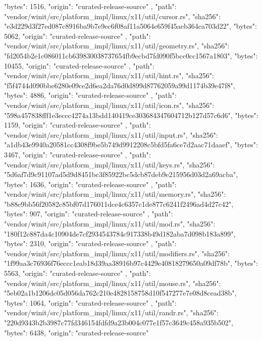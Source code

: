 {{      "bytes": 1516,
      "origin": "curated-release-source"
    },
    {
      "path": "vendor/winit/src/platform_impl/linux/x11/util/cursor.rs",
      "sha256": "e3d229d3f27ed087c8916ba9b7e9ec6f08af11a5064e659f45aeb364ca703d22",
      "bytes": 5062,
      "origin": "curated-release-source"
    },
    {
      "path": "vendor/winit/src/platform_impl/linux/x11/util/geometry.rs",
      "sha256": "fd2054b2e1c086011cb639830038737654fb9ecbd7fd090f5bcc0cc1567a1803",
      "bytes": 10455,
      "origin": "curated-release-source"
    },
    {
      "path": "vendor/winit/src/platform_impl/linux/x11/util/hint.rs",
      "sha256": "f5f4744d090bbe6280e09ce2d6ea2da76d0d899d87762059a99d1174b39e47f8",
      "bytes": 4886,
      "origin": "curated-release-source"
    },
    {
      "path": "vendor/winit/src/platform_impl/linux/x11/util/icon.rs",
      "sha256": "598a457838fff1e3eccc4274a13bdd140419ce303684347604712b127d57c6d6",
      "bytes": 1159,
      "origin": "curated-release-source"
    },
    {
      "path": "vendor/winit/src/platform_impl/linux/x11/util/input.rs",
      "sha256": "a1db43e9940a20581cc4308f9be5b749d9912208c5bfd5fa6ce7d2aac71daaef",
      "bytes": 3467,
      "origin": "curated-release-source"
    },
    {
      "path": "vendor/winit/src/platform_impl/linux/x11/util/keys.rs",
      "sha256": "5d6af7d9c91107ad5d9d8451bc3f85922bc5dcb87deb9e215956d03d2a69acba",
      "bytes": 1636,
      "origin": "curated-release-source"
    },
    {
      "path": "vendor/winit/src/platform_impl/linux/x11/util/memory.rs",
      "sha256": "b88e9bb56f20582c85bf07d176011dce4c6357c1de877c6241f2496ad4d27c42",
      "bytes": 907,
      "origin": "curated-release-source"
    },
    {
      "path": "vendor/winit/src/platform_impl/linux/x11/util/mod.rs",
      "sha256": "180f12c887da4c10904de7cf2934543784c917338b49d182aba7d098b183a899",
      "bytes": 2310,
      "origin": "curated-release-source"
    },
    {
      "path": "vendor/winit/src/platform_impl/linux/x11/util/modifiers.rs",
      "sha256": "1f99aa3c76936f76eccc1eab18d39aa38916b97c4429e40818279650a09df78b",
      "bytes": 5563,
      "origin": "curated-release-source"
    },
    {
      "path": "vendor/winit/src/platform_impl/linux/x11/util/mouse.rs",
      "sha256": "5eb02a1b1206dc05d056da762c210e4828158758d10f547277e7e08d8cead38b",
      "bytes": 1064,
      "origin": "curated-release-source"
    },
    {
      "path": "vendor/winit/src/platform_impl/linux/x11/util/randr.rs",
      "sha256": "220d9343b2b3987c77fd346154fdfd9a23b004c077e1f57c3649c458a935b502",
      "bytes": 6438,
      "origin": "curated-release-source"
}}

